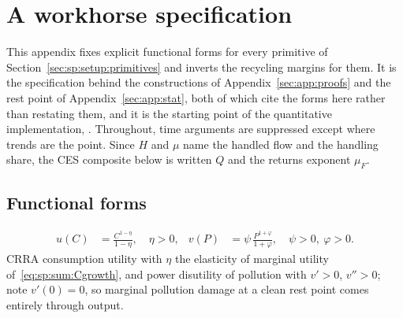 \section{A workhorse specification}\label{sec:app:workhorse}

This appendix fixes explicit functional forms for every primitive of Section~\ref{sec:sp:setup:primitives} and inverts the recycling margins for them. It is the specification behind the constructions of Appendix~\ref{sec:app:proofs} and the rest point of Appendix~\ref{sec:app:stat}, both of which cite the forms here rather than restating them, and it is the starting point of the quantitative implementation, \quantnote{}. Throughout, time arguments are suppressed except where trends are the point. Since $H$ and $\mu$ name the handled flow and the handling share, the CES composite below is written $Q$ and the returns exponent $\mu_F$.

\subsection{Functional forms}\label{sec:app:workhorse:forms}

\begin{align}
u\left(C\right) &= \frac{C^{1-\eta}}{1-\eta},\quad \eta>0,
&
v\left(P\right) &= \psi\,\frac{P^{1+\varphi}}{1+\varphi},\quad \psi>0,\ \varphi>0.
\label{eq:app:wh:preferences}
\end{align}
CRRA consumption utility with $\eta$ the elasticity of marginal utility of~\eqref{eq:sp:sum:Cgrowth}, and power disutility of pollution with $v'>0$, $v''>0$; note $v'\left(0\right)=0$, so marginal pollution damage at a clean rest point comes entirely through output.

